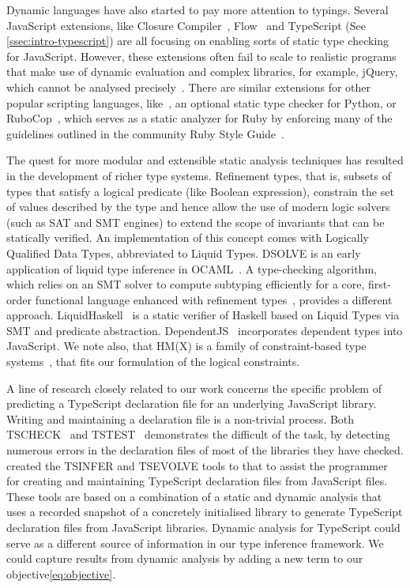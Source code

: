 \documentclass[acmsmall, review, anonymous]{acmart}\settopmatter{printfolios=true,printccs=false,printacmref=false}
\begin{document}
Dynamic languages have also started to pay more attention to typings. Several
JavaScript extensions, like Closure Compiler~\citep{closure}, Flow~\cite{flow} and
TypeScript (See \cref{ssec:intro-typescript}) are all focusing on enabling
sorts of static type checking for JavaScript.
%
%
However, these
extensions often fail to scale to realistic programs that make use of dynamic
evaluation and complex libraries, for example, jQuery, which cannot be analysed
precisely~\cite{jensen09}.
%
There are similar extensions for other popular scripting languages,
like~\citep{mypy}, an optional static type checker for Python,
or RuboCop~\citep{rubycop}, which serves as a static analyzer for Ruby by enforcing many of the guidelines
outlined in the community Ruby Style Guide~\citep{rubystyle}.

The quest for more modular and extensible static analysis techniques has
resulted in the development of richer type systems.
Refinement types, that is, subsets of types that satisfy a logical predicate (like Boolean expression),
constrain the set of values described by the type and hence allow the use of
modern logic solvers (such as SAT and SMT engines) to extend the
scope of invariants that can be statically verified.
An implementation of this concept comes with Logically Qualified Data Types,
abbreviated to Liquid Types.
DSOLVE is an early application of liquid type inference in OCAML~\citep{liquid}.
A type-checking algorithm, which relies on an SMT solver
to compute subtyping efficiently for a core, first-order functional language
enhanced with refinement types~\citep{semanticSMT}, provides a different
approach.
LiquidHaskell~\citep{refHaskell} is a static verifier of
Haskell based on Liquid Types via SMT and predicate
abstraction.
DependentJS~\citep{dependentJS} incorporates dependent types into JavaScript. We note also, that HM(X) is a family of constraint-based type
systems~\citep{odersky99,pottier05}, that fits our formulation of the logical constraints.

A line of research closely related to our work concerns
the specific problem of predicting a TypeScript declaration file for an underlying JavaScript library. Writing and maintaining a declaration file is a non-trivial process. Both TSCHECK~\cite{feldthaus14} and TSTEST~\cite{kristensen17} demonstrates the difficult of the task, by detecting numerous errors in the declaration files of most of the libraries they have checked. \cite{tstools17} created the TSINFER and TSEVOLVE tools to that to assist the 
programmer for creating and maintaining TypeScript declaration files from JavaScript files. These tools are based on a combination of a static and dynamic analysis that uses a recorded snapshot of a concretely initialised library to generate TypeScript declaration files from JavaScript libraries. Dynamic analysis for TypeScript could serve as a different
source of information in our type inference framework. We
could capture results from dynamic analysis by adding a new term to our objective\eqref{eq:objective}.
\end{document}

